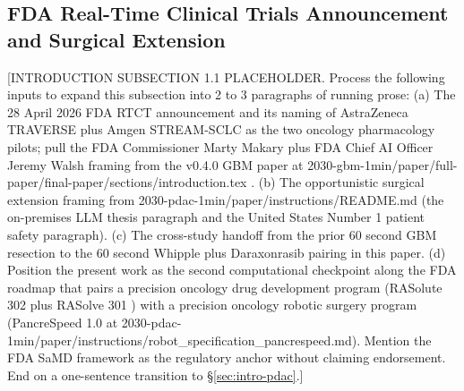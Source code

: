 %

\subsection{FDA Real-Time Clinical Trials Announcement and Surgical Extension}
\label{sec:intro-fda}

[INTRODUCTION SUBSECTION 1.1 PLACEHOLDER. Process the following inputs to expand this subsection into 2 to 3 paragraphs of running prose:
(a) The 28 April 2026 FDA RTCT announcement \cite{fda2026realtime} and its naming of AstraZeneca TRAVERSE plus Amgen STREAM-SCLC as the two oncology pharmacology pilots; pull the FDA Commissioner Marty Makary plus FDA Chief AI Officer Jeremy Walsh framing from the v0.4.0 GBM paper at 2030-gbm-1min/paper/full-paper/final-paper/sections/introduction.tex \cite{kawchak_2026_20113157}.
(b) The opportunistic surgical extension framing from 2030-pdac-1min/paper/instructions/README.md (the on-premises LLM thesis paragraph and the United States Number 1 patient safety paragraph).
(c) The cross-study handoff from the prior 60 second GBM resection \cite{kawchak_2026_20113157} to the 60 second Whipple plus Daraxonrasib pairing in this paper.
(d) Position the present work as the second computational checkpoint along the FDA roadmap that pairs a precision oncology drug development program (RASolute 302 plus RASolve 301 \cite{rasolute302, rasolve301}) with a precision oncology robotic surgery program (PancreSpeed 1.0 at 2030-pdac-1min/paper/instructions/robot_specification_pancrespeed.md). Mention the FDA SaMD framework \cite{fda-samd} as the regulatory anchor without claiming endorsement.
End on a one-sentence transition to \S \ref{sec:intro-pdac}.]

